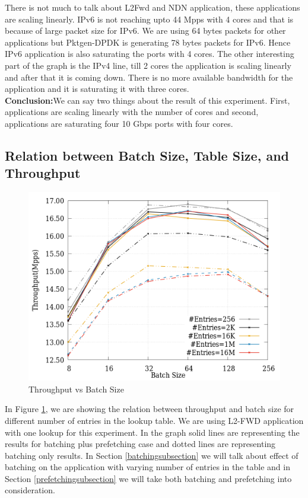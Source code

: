 There is not much to talk about L2Fwd and NDN application, these applications are scaling linearly. IPv6 is not reaching upto 44 Mpps with 4 cores and that is because of large packet size for IPv6. We are using 64 bytes packets for other applications but Pktgen-DPDK is generating 78 bytes packets for IPv6. Hence IPv6 application is also saturating the ports with 4 cores. The other interesting part of the graph is the IPv4 line, till 2 cores the application is scaling linearly and after that it is coming down. There is no more available bandwidth for the application and it is saturating it with three cores. 
\\
\textbf{Conclusion:}We can say two things about the result of this experiment. First, applications are scaling linearly with the number of cores and second, applications are saturating four 10 Gbps ports with four cores.

\subsection{Relation between Batch Size, Table Size, and Throughput}
\label{batchvstable}
\begin{figure}[ht]
\includegraphics[width = \linewidth]{Figures/TableSizeVsbatchSize.png}
\caption{Throughput vs Batch Size}
\label{tablesize}
\end{figure}
In Figure \ref{tablesize}, we are showing the relation between throughput and batch size for different number of entries in the lookup table. We are using L2-FWD application with one lookup for this experiment. In the graph solid lines are representing the results for batching plus prefetching case and dotted lines are representing batching only results. In Section \ref{batchingsubsection} we will talk about effect of batching on the application with varying number of entries in the table and in Section \ref{prefetchingsubsection} we will take both batching and prefetching into consideration.

